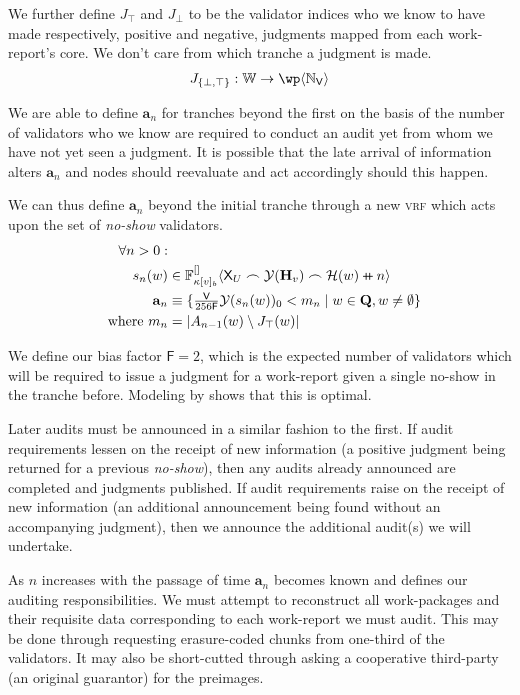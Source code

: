We further define $J_\top$ and $J_\bot$ to be the validator indices who we know to have made respectively, positive and negative, judgments mapped from each work-report's core. We don't care from which tranche a judgment is made.
\begin{align}
  J_{\{\bot, \top\}}: \workreport \to \powset{\N_\mathsf{V}}
\end{align}

We are able to define $\mathbf{a}_n$ for tranches beyond the first on the basis of the number of validators who we know are required to conduct an audit yet from whom we have not yet seen a judgment. It is possible that the late arrival of information alters $\mathbf{a}_n$ and nodes should reevaluate and act accordingly should this happen.

We can thus define $\mathbf{a}_n$ beyond the initial tranche through a new \textsc{vrf} which acts upon the set of \emph{no-show} validators.
\begin{align}
  \nonumber\forall n > 0:&\\
  \ s_n(w) &\in \bandersig{\kappa[v]_b}{\mathsf{X}_U \concat \banderout{\mathbf{H}_v}\concat\blake(w)\doubleplus n}{[]} \\
  \ \mathbf{a}_n &\equiv \{ \textstyle\frac{\mathsf{V}}{256\mathsf{F}}\banderout{s_n(w)}_0 < m_n \mid w \in \mathbf{Q}, w \ne \none \}\!\!\!\!\\
  \nonumber \where m_n &= |A_{n - 1}(w) \setminus J_\top(w)|
\end{align}

We define our bias factor $\mathsf{F} = 2$, which is the expected number of validators which will be required to issue a judgment for a work-report given a single no-show in the tranche before. Modeling by \cite{cryptoeprint:2024/961} shows that this is optimal.

Later audits must be announced in a similar fashion to the first. If audit requirements lessen on the receipt of new information (\ie a positive judgment being returned for a previous \emph{no-show}), then any audits already announced are completed and judgments published. If audit requirements raise on the receipt of new information (\ie an additional announcement being found without an accompanying judgment), then we announce the additional audit(s) we will undertake.

As $n$ increases with the passage of time $\mathbf{a}_n$ becomes known and defines our auditing responsibilities. We must attempt to reconstruct all work-packages and their requisite data corresponding to each work-report we must audit. This may be done through requesting erasure-coded chunks from one-third of the validators. It may also be short-cutted through asking a cooperative third-party (\eg an original guarantor) for the preimages.

